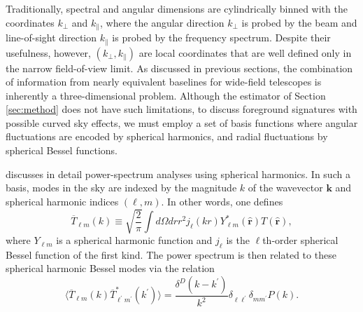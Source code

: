 \documentclass[twocolumn,apj,numberedappendix]{emulateapj}
\renewcommand\[{\begin{equation}}
\renewcommand\]{\end{equation}}
\begin{document}
Traditionally, spectral and angular dimensions are cylindrically binned with the coordinates $k_\bot$ and  $k_\parallel$, where the angular direction $k_\bot$ is probed by the beam and line-of-sight direction $k_\parallel$ is probed by the frequency spectrum. Despite their usefulness, however, $(k_\bot, k_\parallel)$ are local coordinates that are well defined only in the narrow field-of-view limit. 
As discussed in previous sections, the combination of information from nearly equivalent baselines for wide-field telescopes is inherently a three-dimensional problem. Although the estimator of Section \ref{sec:method} does not have such limitations, to discuss foreground signatures with possible curved sky effects, we must employ a set of basis functions where angular fluctuations are encoded by spherical harmonics, and radial fluctuations by spherical Bessel functions. 

\cite{sphere} discusses in detail power-spectrum analyses using spherical harmonics. In such a basis, modes in the sky are indexed by the magnitude $k$ of the wavevector $\mathbf{k}$ and spherical harmonic indices $(\ell, m)$. In other words, one defines
\begin{equation}
\overline{T}_{\ell m} (k) \equiv \sqrt{\frac{2}{\pi}} \int d\Omega dr r^2 j_\ell (kr) Y_{\ell m}^* (\hat{\mathbf{r}}) T (\hat{\mathbf{r}}),
\end{equation}
where $Y_{\ell m}$ is a spherical harmonic function and $j_\ell$ is the $\ell$th-order spherical Bessel function of the first kind. The power spectrum is then related to these spherical harmonic Bessel modes via the relation
\begin{equation}
\label{eq:SHB}
\langle \overline{T}_{\ell m} (k) \overline{T}_{\ell^\prime m^\prime}^* (k^\prime) \rangle = \frac{\delta^D (k - k^\prime)}{k^2} \delta_{\ell \ell^\prime} \delta_{m m^\prime} P(k).
\end{equation}
\end{document}
